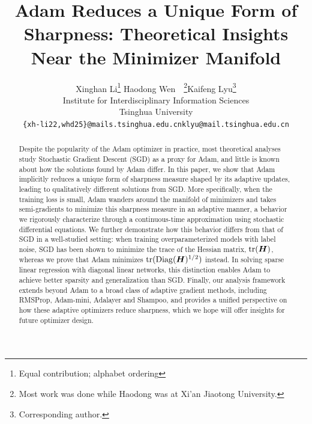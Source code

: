 \documentclass{article}
\title{Adam Reduces a Unique Form of Sharpness:
Theoretical Insights Near the Minimizer Manifold}
\author{%
  Xinghan Li\thanks{Equal contribution; alphabet ordering} \quad Haodong Wen\footnotemark[1]~~\thanks{Most work was done while Haodong was at Xi’an Jiaotong University.}\quad Kaifeng Lyu\thanks{Corresponding author.}\\
  Institute for Interdisciplinary Information Sciences\\
        Tsinghua University\\
  \texttt{\{xh-li22,whd25\}@mails.tsinghua.edu.cn\quad klyu@mail.tsinghua.edu.cn} \\
}
\begin{document}
\maketitle

\begin{abstract}
    Despite the popularity of the Adam optimizer in practice, most theoretical analyses study Stochastic Gradient Descent (SGD) as a proxy for Adam, and little is known about how the solutions found by Adam differ. In this paper, we show that Adam implicitly reduces a unique form of sharpness measure shaped by its adaptive updates, leading to qualitatively different solutions from SGD.
    More specifically, when the training loss is small, Adam wanders around the manifold of minimizers and takes semi-gradients to minimize this sharpness measure in an adaptive manner, a behavior we rigorously characterize through a continuous-time approximation using stochastic differential equations.
    We further demonstrate how this behavior differs from that of SGD in a well-studied setting: when training overparameterized models with label noise, SGD has been shown to minimize the trace of the Hessian matrix, $\text{tr}({\bm{H}})$, whereas we prove that Adam minimizes $\text{tr}(\mathrm{Diag}({\bm{H}})^{1/2})$ instead.
    In solving sparse linear regression with diagonal linear networks, this distinction enables Adam to achieve better sparsity and generalization than SGD.
    Finally, our analysis framework extends beyond Adam to a broad class of adaptive gradient methods, including RMSProp, Adam-mini, Adalayer and Shampoo, and provides a unified perspective on how these adaptive optimizers reduce sharpness, which we hope will offer insights for future optimizer design.


\end{abstract}
\end{document}
